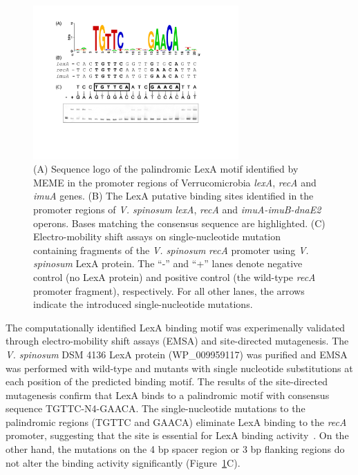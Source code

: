 \begin{figure}
  \centering
  \includegraphics[width=0.7\textwidth]{figures/chapter5/verruco_lexa}
  \caption[(A) Sequence logo of the palindromic LexA motif identified by MEME
  in the promoter regions of Verrucomicrobia \textit{lexA}, \textit{recA} and
  \textit{imuA} genes. (B) The LexA putative binding sites identified in the
  promoter regions of \textit{V. spinosum} \textit{lexA}, \textit{recA} and
  \textit{imuA-imuB-dnaE2} operons.]{(A) Sequence logo of the palindromic LexA
    motif identified by MEME in the promoter regions of Verrucomicrobia
    \textit{lexA}, \textit{recA} and \textit{imuA} genes. (B) The LexA putative
    binding sites identified in the promoter regions of \textit{V. spinosum}
    \textit{lexA}, \textit{recA} and \textit{imuA-imuB-dnaE2} operons. Bases
    matching the consensus sequence are highlighted. (C) Electro-mobility shift
    assays on single-nucleotide mutation containing fragments of the
    \textit{V. spinosum} \textit{recA} promoter using \textit{V. spinosum} LexA
    protein. The ``-'' and ``+'' lanes denote negative control (no LexA
    protein) and positive control (the wild-type \textit{recA} promoter
    fragment), respectively. For all other lanes, the arrows indicate the
    introduced single-nucleotide mutations.}
  \label{fig:verruco-lexa}
\end{figure}

The computationally identified LexA binding motif was experimenally validated
through electro-mobility shift assays (EMSA) and site-directed mutagenesis.
The \textit{V. spinosum} DSM 4136
LexA protein (WP\_009959117) was purified and EMSA was performed with wild-type
and mutants with single nucleotide substitutions at each position of the
predicted binding motif. The results of the site-directed mutagenesis confirm
that LexA binds to a palindromic motif with consensus sequence
TGTTC-N4-GAACA\@. The single-nucleotide mutations to the palindromic regions
(TGTTC and GAACA) eliminate LexA binding to the \textit{recA} promoter,
suggesting that the site is essential for LexA binding
activity~\citep{groban2005binding}. On the other hand, the mutations on the 4 bp
spacer region or 3 bp flanking regions do not alter the binding activity
significantly (Figure~\ref{fig:verruco-lexa}C).

